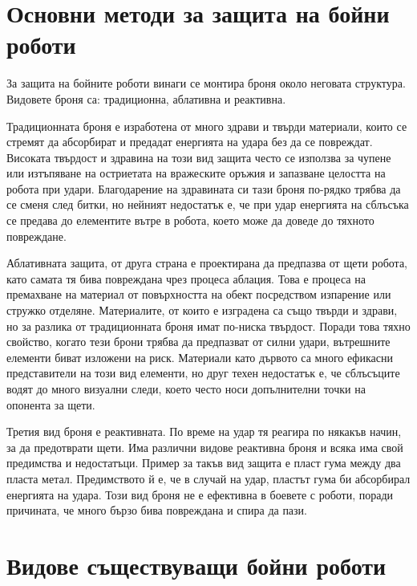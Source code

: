 \section{Основни методи за защита на бойни роботи}

За защита на бойните роботи винаги се монтира броня около неговата структура. Видовете броня са: традиционна, аблативна и реактивна.

Традиционната броня е изработена от много здрави и твърди материали, които се стремят да абсорбират и предадат енергията на удара без да се повреждат. Високата твърдост и здравина на този вид защита често се използва за чупене или изтъпяване на остриетата на вражеските оръжия и запазване целостта на робота при удари. Благодарение на здравината си тази броня по-рядко трябва да се сменя след битки, но нейният недостатък е, че при удар енергията на сблъсъка се предава до елементите вътре в робота, което може да доведе до тяхното повреждане.

Аблативната защита, от друга страна е проектирана да предпазва от щети робота, като самата тя бива повреждана чрез процеса аблация. Това е процеса на премахване на материал от повърхността на обект посредством изпарение или стружко отделяне. Материалите, от които е изградена са също твърди и здрави, но за разлика от традиционната броня имат по-ниска твърдост. Поради това тяхно свойство, когато тези брони трябва да предпазват от силни удари, вътрешните елементи биват изложени на риск. Материали като дървото са много ефикасни представители на този вид елементи, но друг техен недостатък е, че сблъсъците водят до много визуални следи, което често носи допълнителни точки на опонента за щети.

Третия вид броня е реактивната. По време на удар тя реагира по някакъв начин, за да предотврати щети. Има различни видове реактивна броня и всяка има свой предимства и недостатъци. Пример за такъв вид защита е пласт гума между два пласта метал. Предимството й е, че в случай на удар, пластът гума би абсорбирал енергията на удара. Този вид броня не е ефективна в боевете с роботи, поради причината, че много бързо бива повреждана и спира да пази.


\section{Видове съществуващи бойни роботи}
\label{sec:robot-types}

